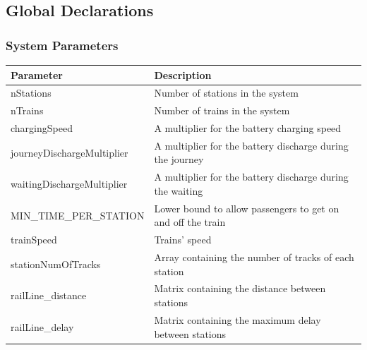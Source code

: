 \subsection{Global Declarations}
\subsubsection{System Parameters}

\begin{table} [H]
    \begin{tabu} to \textwidth {|X|X[2]|}
        \hline
        \textbf{Parameter}              & \textbf{Description} \\  \hline
        nStations                       & Number of stations in the system \\  \hline
        nTrains                         & Number of trains in the system \\    \hline
        chargingSpeed                   & A multiplier for the battery charging speed \\    \hline
        journeyDischargeMultiplier      & A multiplier for the battery discharge during the journey \\  \hline
        waitingDischargeMultiplier      & A multiplier for the battery discharge during the waiting \\  \hline
        MIN\_TIME\_PER\_STATION         & Lower bound to allow passengers to get on and off the train \\    \hline
        trainSpeed                      & Trains' speed \\   \hline
        stationNumOfTracks              & Array containing the number of tracks of each station \\   \hline
        railLine\_distance              & Matrix containing the distance between stations \\    \hline
        railLine\_delay                 & Matrix containing the maximum delay between stations \\   \hline
    \end{tabu}
\end{table}
\bigskip

